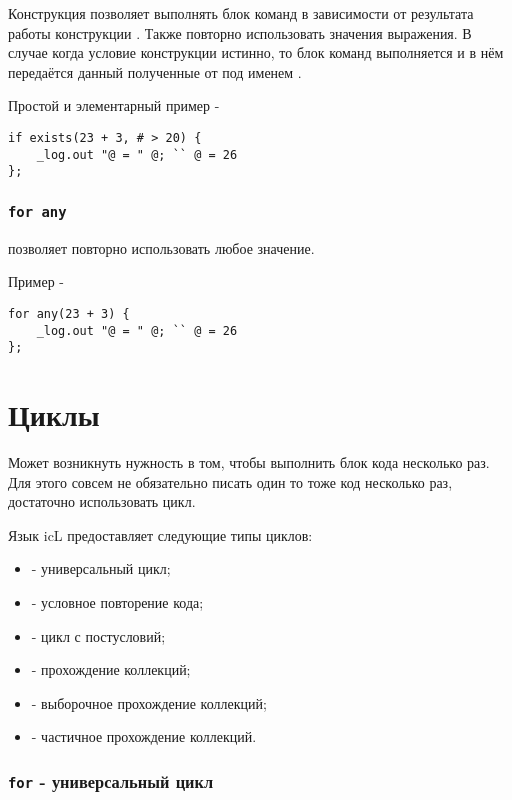 \documentclass[a4paper, 14pt]{extarticle}
\newenvironment{icItems}
	{ \begin{itemize} [noitemsep,nolistsep] }
	{ \end{itemize} }
\begin{document}
Конструкция  позволяет выполнять блок команд в зависимости от результата работы конструкции . Также повторно использовать значения выражения. В случае когда условие конструкции  истинно, то блок команд выполняется и в нём передаётся данный полученные от  под именем .

\indent Простой и элементарный пример -
\begin{lstlisting}
if exists(23 + 3, # > 20) {
	_log.out "@ = " @; `` @ = 26
};
\end{lstlisting}

\subsubsection{\lstinline`for any`}

 позволяет повторно использовать любое значение.

\noindent Пример -
\begin{lstlisting}
for any(23 + 3) {
	_log.out "@ = " @; `` @ = 26
};
\end{lstlisting}

\newpage
\section{Циклы}

Может возникнуть нужность в том, чтобы выполнить блок кода несколько раз. Для этого совсем не обязательно писать один то тоже код несколько раз, достаточно использовать цикл.

Язык icL предоставляет следующие типы циклов:

\begin{icItems}
\item
	 - универсальный цикл;
\item
	 - условное повторение кода;
\item
	 - цикл с постусловий;
\item
	 - прохождение коллекций;
\item
	 - выборочное прохождение коллекций;
\item
	 - частичное прохождение коллекций.
\end{icItems}


\subsubsection{\lstinline`for` - универсальный цикл}
\end{document}
